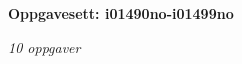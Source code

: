 \centerline{\bf Oppgavesett: i01490no-i01499no}
\vskip 10pt
\centerline{\it 10 oppgaver}\vskip 10pt
\vskip 10pt
